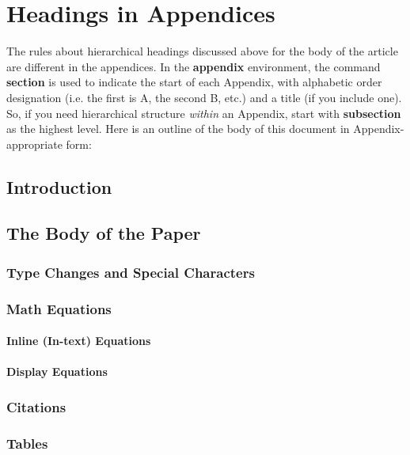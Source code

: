 \documentclass{sig-alternate-sigmod08}
\begin{document}
%

%
%
\appendix
\section{Headings in Appendices}
The rules about hierarchical headings discussed above for
the body of the article are different in the appendices.
In the \textbf{appendix} environment, the command
\textbf{section} is used to
indicate the start of each Appendix, with alphabetic order
designation (i.e. the first is A, the second B, etc.) and
a title (if you include one).  So, if you need
hierarchical structure
\textit{within} an Appendix, start with \textbf{subsection} as the
highest level. Here is an outline of the body of this
document in Appendix-appropriate form:
\subsection{Introduction}
\subsection{The Body of the Paper}
\subsubsection{Type Changes and  Special Characters}
\subsubsection{Math Equations}
\paragraph{Inline (In-text) Equations}
\paragraph{Display Equations}
\subsubsection{Citations}
\subsubsection{Tables}
\end{document}

